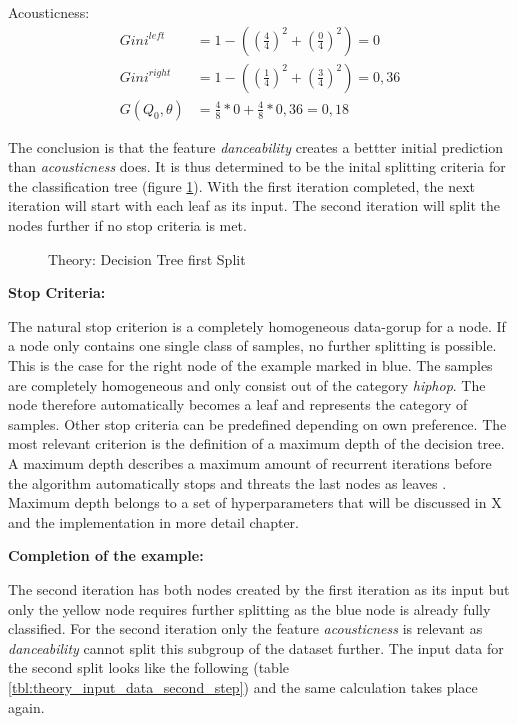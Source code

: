 Acousticness: 
\begin{equation*}
    \begin{aligned}
        Gini^{left}  &= 1 - ((\frac{4}{4})^2 + (\frac{0}{4})^2) = 0
        \\
        Gini^{right} &= 1 - ((\frac{1}{4})^2 + (\frac{3}{4})^2) = 0,36
        \\
        G(Q_{0},\theta) &= \frac{4}{8} * 0 + \frac{4}{8} * 0,36 = 0,18
    \end{aligned}
\end{equation*}

The conclusion is that the feature \emph{danceability} creates a bettter initial prediction than \emph{acousticness} does. It is thus 
determined to be the inital splitting criteria for the classification tree (figure \ref{fig:theory_first_split}). With the first iteration completed, the next iteration
will start with each leaf as its input. The second iteration will split the nodes further if no stop criteria is met. 

\begin{figure}[H]
    \centering
    \qquad
    \caption{Theory: Decision Tree first Split}%
    \label{fig:theory_first_split}%
\end{figure}

\textbf{Stop Criteria:}

The natural stop criterion is a completely homogeneous data-gorup for a node. If a node only contains one single 
class of samples, no further splitting is possible. This is the case for the right node of the example marked in blue. The samples are completely
homogeneous and only consist out of the category \emph{hiphop}. The node therefore automatically becomes a leaf and represents the 
category of samples. Other stop criteria can be predefined depending on own preference. The most relevant criterion is the 
definition of a maximum depth of the decision tree. A maximum depth describes a maximum amount of recurrent iterations before 
the algorithm automatically stops and threats the last nodes as leaves \cite[p.7]{lewis2000introduction}. Maximum depth belongs to a set of hyperparameters that
will be discussed in X and the implementation in more detail chapter. 

\textbf{Completion of the example:}

The second iteration has both nodes created by the first iteration as its input but only the yellow node requires further splitting as 
the blue node is already fully classified. For the second iteration only the feature \emph{acousticness} is relevant as \emph{danceability} cannot 
split this subgroup of the dataset further. The input data for the second split looks like the following (table \ref{tbl:theory_input_data_second_step}) and the same calculation 
takes place again. 

